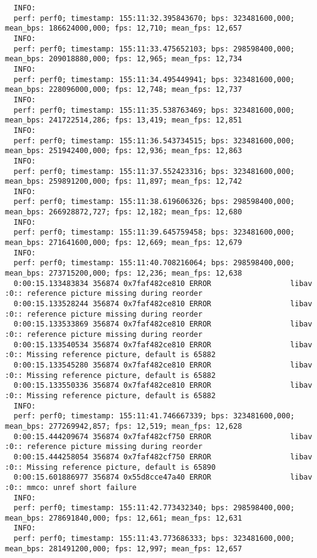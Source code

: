 \documentclass[12pt,oneside]{book}
\begin{document}
\begin{lstlisting}
  INFO:
  perf: perf0; timestamp: 155:11:32.395843670; bps: 323481600,000; mean_bps: 186624000,000; fps: 12,710; mean_fps: 12,657
  INFO:
  perf: perf0; timestamp: 155:11:33.475652103; bps: 298598400,000; mean_bps: 209018880,000; fps: 12,965; mean_fps: 12,734
  INFO:
  perf: perf0; timestamp: 155:11:34.495449941; bps: 323481600,000; mean_bps: 228096000,000; fps: 12,748; mean_fps: 12,737
  INFO:
  perf: perf0; timestamp: 155:11:35.538763469; bps: 323481600,000; mean_bps: 241722514,286; fps: 13,419; mean_fps: 12,851
  INFO:
  perf: perf0; timestamp: 155:11:36.543734515; bps: 323481600,000; mean_bps: 251942400,000; fps: 12,936; mean_fps: 12,863
  INFO:
  perf: perf0; timestamp: 155:11:37.552423316; bps: 323481600,000; mean_bps: 259891200,000; fps: 11,897; mean_fps: 12,742
  INFO:
  perf: perf0; timestamp: 155:11:38.619606326; bps: 298598400,000; mean_bps: 266928872,727; fps: 12,182; mean_fps: 12,680
  INFO:
  perf: perf0; timestamp: 155:11:39.645759458; bps: 323481600,000; mean_bps: 271641600,000; fps: 12,669; mean_fps: 12,679
  INFO:
  perf: perf0; timestamp: 155:11:40.708216064; bps: 298598400,000; mean_bps: 273715200,000; fps: 12,236; mean_fps: 12,638
  0:00:15.133483834 356874 0x7faf482ce810 ERROR                  libav :0:: reference picture missing during reorder
  0:00:15.133528244 356874 0x7faf482ce810 ERROR                  libav :0:: reference picture missing during reorder
  0:00:15.133533869 356874 0x7faf482ce810 ERROR                  libav :0:: reference picture missing during reorder
  0:00:15.133540534 356874 0x7faf482ce810 ERROR                  libav :0:: Missing reference picture, default is 65882
  0:00:15.133545280 356874 0x7faf482ce810 ERROR                  libav :0:: Missing reference picture, default is 65882
  0:00:15.133550336 356874 0x7faf482ce810 ERROR                  libav :0:: Missing reference picture, default is 65882
  INFO:
  perf: perf0; timestamp: 155:11:41.746667339; bps: 323481600,000; mean_bps: 277269942,857; fps: 12,519; mean_fps: 12,628
  0:00:15.444209674 356874 0x7faf482cf750 ERROR                  libav :0:: reference picture missing during reorder
  0:00:15.444258054 356874 0x7faf482cf750 ERROR                  libav :0:: Missing reference picture, default is 65890
  0:00:15.601886977 356874 0x55d8cce47a40 ERROR                  libav :0:: mmco: unref short failure
  INFO:
  perf: perf0; timestamp: 155:11:42.773432340; bps: 298598400,000; mean_bps: 278691840,000; fps: 12,661; mean_fps: 12,631
  INFO:
  perf: perf0; timestamp: 155:11:43.773686333; bps: 323481600,000; mean_bps: 281491200,000; fps: 12,997; mean_fps: 12,657

\end{lstlisting}
\end{document}
